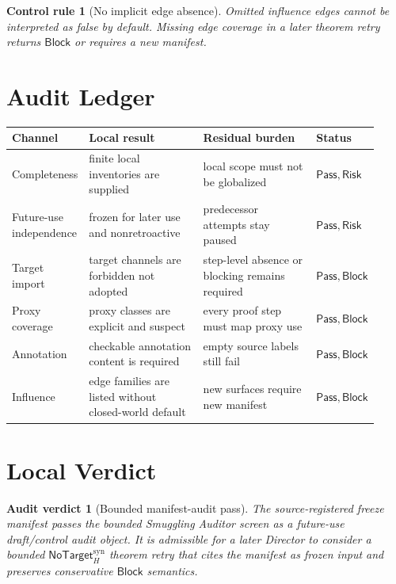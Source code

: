 \documentclass[11pt]{article}
\newcommand{\NoTargetSyn}{\mathsf{NoTarget}_{H}^{\mathrm{syn}}}
\newcommand{\Pass}{\mathsf{Pass}}
\newcommand{\Block}{\mathsf{Block}}
\newcommand{\Risk}{\mathsf{Risk}}
\newtheorem{controlrule}{Control rule}
\newtheorem{auditverdict}{Audit verdict}
\begin{document}
\begin{controlrule}[No implicit edge absence]
Omitted influence edges cannot be interpreted as false by default. Missing
edge coverage in a later theorem retry returns \(\Block\) or requires a
new manifest.
\end{controlrule}

\section{Audit Ledger}

\begin{center}
\begin{tabular}{p{0.18\linewidth}p{0.32\linewidth}p{0.32\linewidth}p{0.10\linewidth}}
\textbf{Channel} & \textbf{Local result} & \textbf{Residual burden} & \textbf{Status} \\
\hline
Completeness & finite local inventories are supplied & local scope must not be globalized & \(\Pass,\Risk\) \\
Future-use independence & frozen for later use and nonretroactive & predecessor attempts stay paused & \(\Pass,\Risk\) \\
Target import & target channels are forbidden not adopted & step-level absence or blocking remains required & \(\Pass,\Block\) \\
Proxy coverage & proxy classes are explicit and suspect & every proof step must map proxy use & \(\Pass,\Block\) \\
Annotation & checkable annotation content is required & empty source labels still fail & \(\Pass,\Block\) \\
Influence & edge families are listed without closed-world default & new surfaces require new manifest & \(\Pass,\Block\) \\
\end{tabular}
\end{center}

\section{Local Verdict}

\begin{auditverdict}[Bounded manifest-audit pass]
The source-registered freeze manifest passes the bounded Smuggling Auditor
screen as a future-use draft/control audit object. It is admissible for a
later Director to consider a bounded \(\NoTargetSyn\) theorem retry that
cites the manifest as frozen input and preserves conservative \(\Block\)
semantics.
\end{auditverdict}
\end{document}

